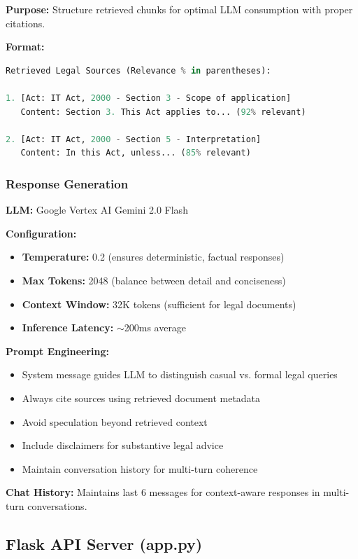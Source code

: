 \documentclass[12pt,a4paper]{article}
\begin{document}
\textbf{Purpose:} Structure retrieved chunks for optimal LLM consumption with proper citations.

\textbf{Format:}
\begin{lstlisting}[language=Python]
Retrieved Legal Sources (Relevance % in parentheses):

1. [Act: IT Act, 2000 - Section 3 - Scope of application]
   Content: Section 3. This Act applies to... (92% relevant)

2. [Act: IT Act, 2000 - Section 5 - Interpretation]
   Content: In this Act, unless... (85% relevant)
\end{lstlisting}

\subsubsection{Response Generation}

\textbf{LLM:} Google Vertex AI Gemini 2.0 Flash

\textbf{Configuration:}
\begin{itemize}
    \item \textbf{Temperature:} 0.2 (ensures deterministic, factual responses)
    \item \textbf{Max Tokens:} 2048 (balance between detail and conciseness)
    \item \textbf{Context Window:} 32K tokens (sufficient for legal documents)
    \item \textbf{Inference Latency:} $\sim$200ms average
\end{itemize}

\textbf{Prompt Engineering:}
\begin{itemize}
    \item System message guides LLM to distinguish casual vs. formal legal queries
    \item Always cite sources using retrieved document metadata
    \item Avoid speculation beyond retrieved context
    \item Include disclaimers for substantive legal advice
    \item Maintain conversation history for multi-turn coherence
\end{itemize}

\textbf{Chat History:} Maintains last 6 messages for context-aware responses in multi-turn conversations.

\subsection{Flask API Server (app.py)}
\end{document}
